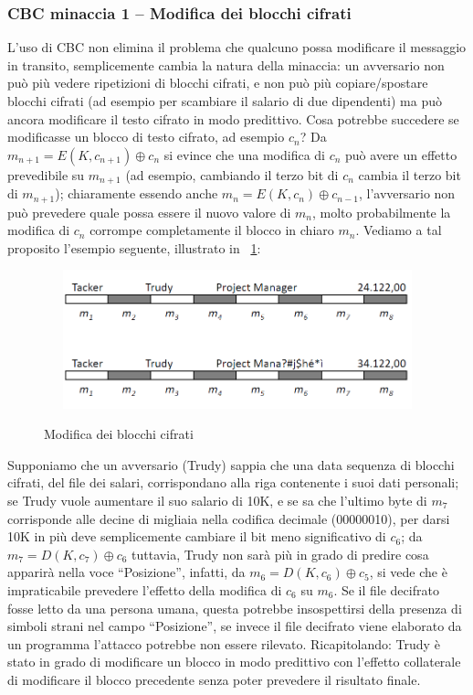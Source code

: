 \subsubsection{CBC minaccia 1 – Modifica dei blocchi cifrati}
L’uso di CBC non elimina il problema che qualcuno possa modificare il messaggio in transito, semplicemente cambia la natura della minaccia: un avversario non può più vedere ripetizioni di blocchi cifrati, e non può più copiare/spostare blocchi cifrati (ad esempio per scambiare il salario di due dipendenti) ma può ancora modificare il testo cifrato in modo predittivo. \newline
Cosa potrebbe succedere se modificasse un blocco di testo cifrato, ad esempio $c_{n}$?\newline
Da $m_{n+1} = E(K,c_{n+1})\oplus c_{n}$ si evince che una modifica di $c_{n}$ può avere un effetto prevedibile su $m_{n+1}$ (ad esempio, cambiando il terzo bit di $c_{n}$ cambia il terzo bit di $m_{n+1}$);
chiaramente essendo anche $m_{n} = E(K,c_{n})\oplus c_{n-1}$,  l'avversario non può prevedere quale possa essere il nuovo valore di $m_{n}$, molto probabilmente la modifica di $c_{n}$ corrompe completamente il blocco in chiaro $m_{n}$.\newline
Vediamo a tal proposito l'esempio seguente, illustrato in \figurename ~\ref{fig:modifica_blk_cifrati}:
\begin{figure}[htbp]
	\centering%
	\subfigure%
	{\includegraphics[height=4cm, width=12cm, keepaspectratio]{Immagini/Capitolo3/modifica_blk_cifrati.png}}
	\caption{Modifica dei blocchi cifrati \label{fig:modifica_blk_cifrati}}	
\end{figure}
\newline Supponiamo che un avversario (Trudy) sappia che una data sequenza di blocchi cifrati, del file
dei salari, corrispondano alla riga contenente i suoi dati personali; se Trudy vuole aumentare il suo salario di 10K, e se sa che l'ultimo byte di $m_{7}$ corrisponde alle decine di migliaia nella codifica decimale (00000010), per darsi 10K in più deve semplicemente cambiare il bit meno significativo di $c_{6}$; da $m_{7} = D(K, c_{7}) \oplus c_{6}$ tuttavia, Trudy non sarà più in grado di predire cosa apparirà nella voce “Posizione”, infatti, da $m_{6} = D(K, c_{6}) \oplus c_{5}$, si vede che è impraticabile
prevedere l'effetto della modifica di $c_{6}$ su $m_{6}$. Se il file decifrato fosse letto da una persona umana, questa potrebbe insospettirsi della presenza di simboli strani nel campo “Posizione”, se invece il file decifrato viene elaborato da un programma l'attacco potrebbe non essere rilevato.\newline \newline
Ricapitolando: Trudy è stato in grado di modificare un blocco in modo predittivo con l'effetto collaterale di modificare il blocco precedente senza poter prevedere il risultato finale.

